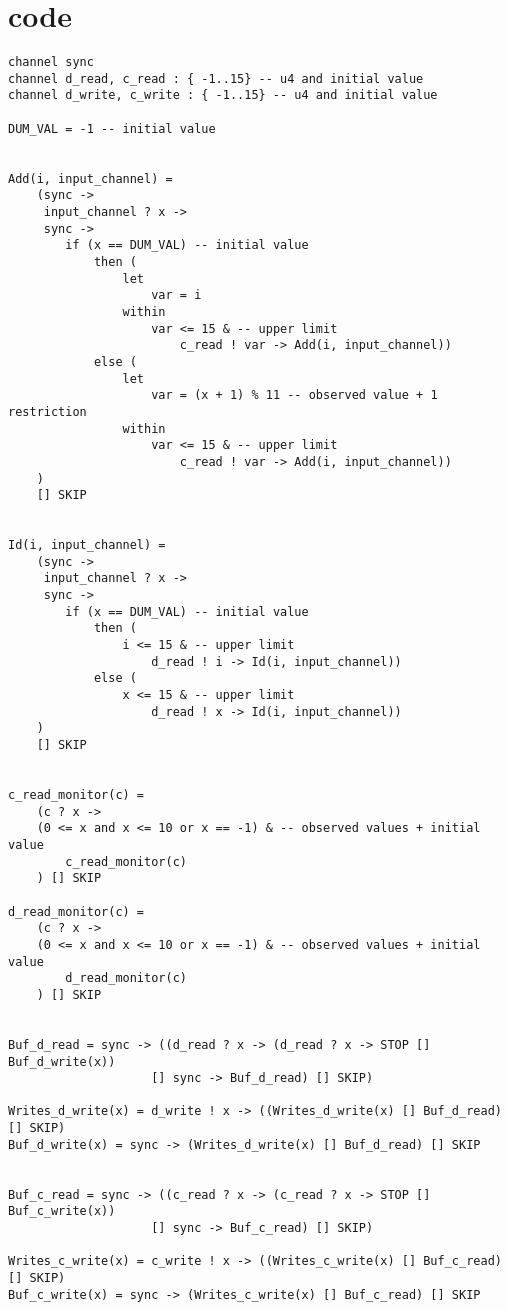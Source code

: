 \section*{\cspm{} code}
\begin{verbatim}
channel sync
channel d_read, c_read : { -1..15} -- u4 and initial value
channel d_write, c_write : { -1..15} -- u4 and initial value

DUM_VAL = -1 -- initial value


Add(i, input_channel) =
    (sync ->
     input_channel ? x ->
     sync ->
        if (x == DUM_VAL) -- initial value
            then (
                let
                    var = i
                within
                    var <= 15 & -- upper limit
                        c_read ! var -> Add(i, input_channel))
            else (
                let
                    var = (x + 1) % 11 -- observed value + 1 restriction
                within
                    var <= 15 & -- upper limit
                        c_read ! var -> Add(i, input_channel))
    )
    [] SKIP


Id(i, input_channel) =
    (sync ->
     input_channel ? x ->
     sync ->
        if (x == DUM_VAL) -- initial value
            then (
                i <= 15 & -- upper limit
                    d_read ! i -> Id(i, input_channel))
            else (
                x <= 15 & -- upper limit
                    d_read ! x -> Id(i, input_channel))
    )
    [] SKIP


c_read_monitor(c) =
    (c ? x ->
    (0 <= x and x <= 10 or x == -1) & -- observed values + initial value
        c_read_monitor(c)
    ) [] SKIP

d_read_monitor(c) =
    (c ? x ->
    (0 <= x and x <= 10 or x == -1) & -- observed values + initial value
        d_read_monitor(c)
    ) [] SKIP


Buf_d_read = sync -> ((d_read ? x -> (d_read ? x -> STOP [] Buf_d_write(x))
                    [] sync -> Buf_d_read) [] SKIP)

Writes_d_write(x) = d_write ! x -> ((Writes_d_write(x) [] Buf_d_read) [] SKIP)
Buf_d_write(x) = sync -> (Writes_d_write(x) [] Buf_d_read) [] SKIP


Buf_c_read = sync -> ((c_read ? x -> (c_read ? x -> STOP [] Buf_c_write(x))
                    [] sync -> Buf_c_read) [] SKIP)

Writes_c_write(x) = c_write ! x -> ((Writes_c_write(x) [] Buf_c_read) [] SKIP)
Buf_c_write(x) = sync -> (Writes_c_write(x) [] Buf_c_read) [] SKIP


\end{verbatim}
